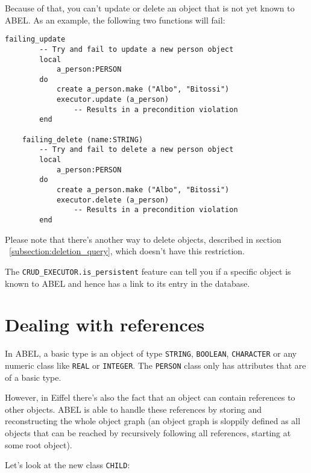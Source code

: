 Because of that, you can't update or delete an object that is not yet known to ABEL.
As an example, the following two functions will fail:

\begin{lstlisting}[language=OOSC2Eiffel, captionpos=b, caption={}, label={lst:failing_update_delete}]
	failing_update
		-- Try and fail to update a new person object
		local
			a_person:PERSON
		do
			create a_person.make ("Albo", "Bitossi")
			executor.update (a_person)
				-- Results in a precondition violation
		end

	failing_delete (name:STRING)
		-- Try and fail to delete a new person object
		local
			a_person:PERSON
		do
			create a_person.make ("Albo", "Bitossi")
			executor.delete (a_person) 
				-- Results in a precondition violation
		end
\end{lstlisting}

Please note that there's another way to delete objects, described in section ~\ref{subsection:deletion_query}, which doesn't have this restriction.

The \lstinline!CRUD_EXECUTOR.is_persistent! feature can tell you if a specific object is known to ABEL and hence has a link to its entry in the data\-base.






\section{Dealing with references}
\label {sec:references}

In ABEL, a basic type is an object of type \lstinline!STRING!, \lstinline!BOOLEAN!, \lstinline!CHARACTER! or any numeric class like \lstinline!REAL! or \lstinline!INTEGER!.
The \lstinline!PERSON! class only has attributes that are of a basic type.

However, in Eiffel there's also the fact that an object can contain references to other objects.
ABEL is able to handle these references by storing and reconstructing the whole object graph 
(an object graph is sloppily defined as all objects that can be reached by recursively following all references, starting at some root object).

Let's look at the new class \lstinline!CHILD!:

